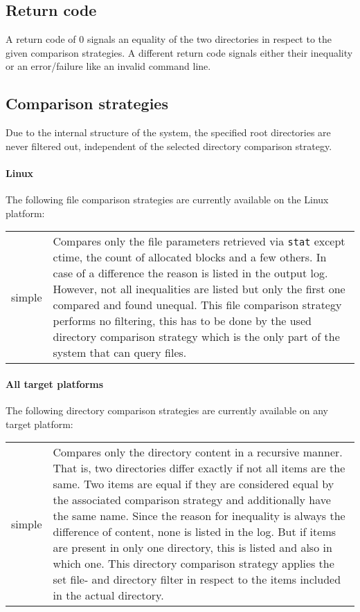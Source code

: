 \documentclass[a4paper]{article}
\begin{document}
	\subsection{Return code}
	\label{subsec:return_code}
	
	A return code of 0 signals an equality of the two directories in respect to the given comparison strategies. A different return code signals either their inequality or an error/failure like an invalid command line.
	
	\subsection{Comparison strategies}
	\label{subsec:comparison_strategies}
	
	Due to the internal structure of the system, the specified root directories are never filtered out, independent of the selected directory comparison strategy.
	
	\paragraph{Linux} The following file comparison strategies are currently available on the Linux platform:
	
	\begin{tabularx}{\linewidth}{lX}
		simple & Compares only the file parameters retrieved via \texttt{stat} except ctime, the count of allocated blocks and a few others. In case of a difference the reason is listed in the output log. However, not all inequalities are listed but only the first one compared and found unequal. This file comparison strategy performs no filtering, this has to be done by the used directory comparison strategy which is the only part of the system that can query files.
	\end{tabularx}
	
	\paragraph{All target platforms} The following directory comparison strategies are currently available on any target platform:
	
	\begin{tabularx}{\linewidth}{lX}
		simple & Compares only the directory content in a recursive manner. That is, two directories differ exactly if not all items are the same. Two items are equal if they are considered equal by the associated comparison strategy and additionally have the same name. Since the reason for inequality is always the difference of content, none is listed in the log. But if items are present in only one directory, this is listed and also in which one. This directory comparison strategy applies the set file- and directory filter in respect to the items included in the actual directory.
	\end{tabularx}
	
\end{document}
